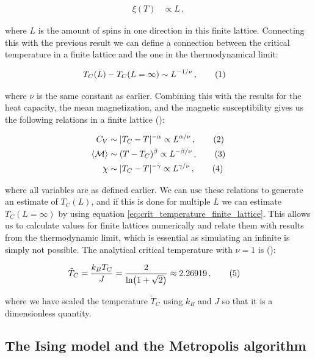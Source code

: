 \documentclass[reprint,english,notitlepage]{revtex4-1}  %
\newcommand\numberthis{\addtocounter{equation}{1}\tag{\theequation}}
\begin{document}
\begin{align*}
\xi (T) &\propto L \, ,
\end{align*}

where $L$ is the amount of spins in one direction in this finite lattice. Connecting this with the previous result we can define a connection between the critical temperature in a finite lattice and the one in the thermodynamical limit:

\begin{align*}
T_C(L) - T_C(L= \infty) &\sim L^{-1/\nu} \, , \numberthis \label{eq:crit_temperature_finite_lattice} 
\end{align*}

where $\nu$ is the same constant as earlier. Combining this with the results for the heat capacity, the mean magnetization, and the magnetic susceptibility gives us the following relations in a finite lattice (\citep[p.78]{landau_binder_2014}):

\begin{align*}
C_V &\sim |T_C - T |^{-\alpha} \propto  L^{\alpha/\nu} \, , \numberthis \label{eq:finite_lattice_heat_capacity} \\
\langle \mathcal M \rangle &\sim (T-T_C)^\beta \propto L^{-\beta /\nu} \, , \numberthis \label{eq:finite_lattice_magnetization_per_spin} \\
\chi &\sim |T_C - T|^{-\gamma} \propto L^{\gamma/\nu} \, , \numberthis \label{eq:finite_lattice_susceptibility}
\end{align*}

where all variables are as defined earlier. We can use these relations to generate an estimate of $T_C(L)$, and if this is done for multiple $L$ we can estimate $T_C(L=\infty)$ by using equation \eqref{eq:crit_temperature_finite_lattice}. This allows us to calculate values for finite lattices numerically and relate them with results from the thermodynamic limit, which is essential as simulating an infinite is simply not possible. The analytical critical temperature with $\nu=1$ is (\citep{L.Onsager1944}):

\begin{align*}
\tilde{T}_C &= \frac{k_B T_C}{J} = \frac{2}{\ln(1 + \sqrt{2})} \approx 2.26919 \, , \numberthis \label{eq:crit_temperature_analytical}
\end{align*}

where we have scaled the temperature $\tilde{T}_C$ using $k_B$ and $J$ so that it is a dimensionless quantity.


\subsection{The Ising model and the Metropolis algorithm} \label{sec:II:b}
\end{document}
